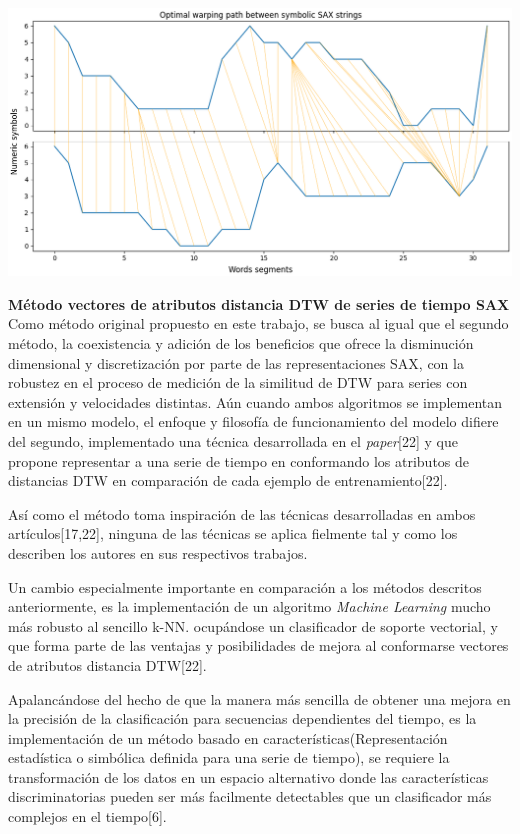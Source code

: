 	\begin{minipage}{\linewidth}
		\centering
		\includegraphics[width=\linewidth]{Imagenes/SAX_DTW.png}
	\end{minipage}
	
\hfill\break
\justifying
\textbf{Método vectores de atributos distancia DTW de series de tiempo SAX}
	\hfill\break
	\justifying
	Como método original propuesto en este trabajo, se busca al igual que el segundo método, la coexistencia y adición de los beneficios que ofrece la disminución dimensional y discretización por parte de las representaciones SAX, con la robustez en el proceso de medición de la similitud de DTW para series con extensión y velocidades distintas. Aún cuando ambos algoritmos se implementan en un mismo modelo, el enfoque y filosofía de funcionamiento del modelo difiere del segundo, implementado una técnica desarrollada en el \textit{paper}[22] y que propone representar a una serie de tiempo en conformando los atributos de distancias DTW en comparación de cada ejemplo de entrenamiento[22].
	
	\hfill\break
	\justifying
	Así como el método toma inspiración de las técnicas desarrolladas en ambos artículos[17,22], ninguna de las técnicas se aplica fielmente tal y como los describen los autores en sus respectivos trabajos.
	
	\hfill\break
	\justifying
	Un cambio especialmente importante en comparación a los métodos descritos anteriormente, es la implementación de un algoritmo \textit{Machine Learning} mucho más robusto al sencillo k-NN. ocupándose un clasificador de soporte vectorial, y que forma parte de las ventajas y posibilidades de mejora al conformarse vectores de atributos distancia DTW[22].
	
	\hfill\break
	\justifying
	Apalancándose del hecho de que la manera más sencilla de obtener una mejora en la precisión de la clasificación para secuencias dependientes del tiempo, es la implementación de un método basado en características(Representación estadística o simbólica definida para una serie de tiempo), se requiere la transformación de los datos en un espacio alternativo donde las características discriminatorias pueden ser más facilmente detectables que un clasificador más complejos en el tiempo[6]. 
	
